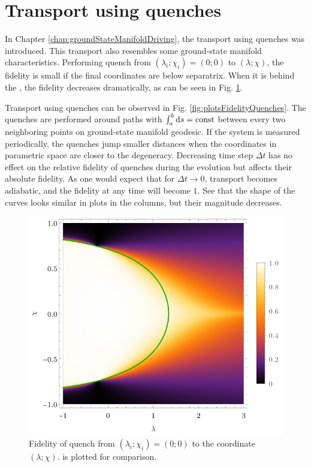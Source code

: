 \section{Transport using quenches}
In Chapter \ref{chap:groundStateManifoldDriving}, the transport using quenches was introduced. This transport also resembles some ground-state manifold characteristics. Performing quench from $(\lambda_i;\chi_i)=(0;0)$ to $(\lambda;\chi)$, the fidelity is small if the final coordinates are below separatrix. When it is behind the , the fidelity decreases dramatically, as can be seen in Fig. \ref{fig:quenchFidelityFrom00}.

Transport using quenches can be observed in Fig. \ref{fig:plotsFidelityQuenches}. The quenches are performed around paths with $\int_{a}^{b} \mathrm{d} s=\text{const}$ between every two neighboring points on ground-state manifold geodesic. If the system is measured periodically, the quenches jump smaller distances when the coordinates in parametric space are closer to the degeneracy. Decreasing time step $\Delta t$ has no effect on the relative fidelity of quenches during the evolution but affects their absolute fidelity. As one would expect that for $\Delta t\rightarrow 0$, transport becomes adiabatic, and the fidelity at any time will become $1$. See that the shape of the curves looks similar in plots in the columns, but their magnitude decreases.

\begin{figure}[h]
    \centering
    \includegraphics[scale=1.2]{../img/quenchFidelityFrom00.pdf}
    \caption{Fidelity of quench from $(\lambda_i;\chi_i)=(0;0)$ to the coordinate $(\lambda;\chi)$.  is plotted for comparison.}
    \label{fig:quenchFidelityFrom00}    
\end{figure}

